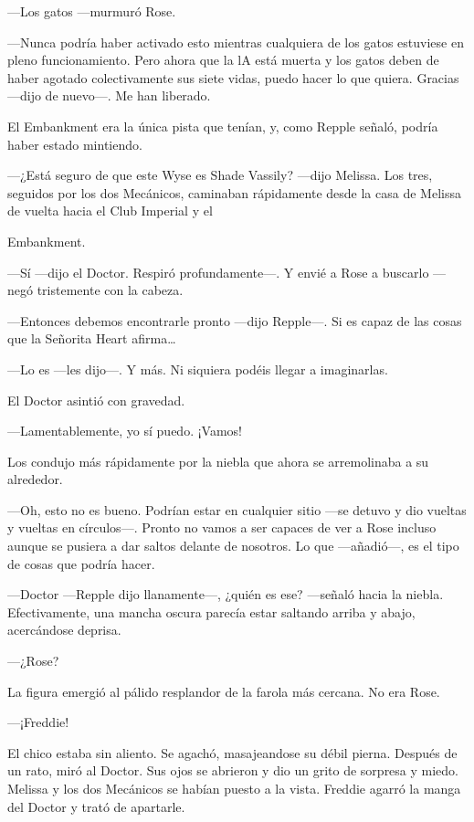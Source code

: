 {---Los gatos ---murmuró Rose.}

{---Nunca podría haber activado esto mientras cualquiera de los gatos
	estuviese en pleno funcionamiento. Pero ahora que la lA está muerta y
	los gatos deben de haber agotado colectivamente sus siete vidas, puedo
hacer lo que quiera. Gracias ---dijo de nuevo---. Me han liberado.}

\mbox{}

{El Embankment era la única pista que tenían, y, como Repple señaló,
podría haber estado mintiendo.}

{---¿Está seguro de que este Wyse es Shade Vassily? ---dijo Melissa. Los
	tres, seguidos por los dos Mecánicos, caminaban rápidamente desde la
casa de Melissa de vuelta hacia el Club Imperial y el}

{Embankment.}

{---Sí ---dijo el Doctor. Respiró profundamente---. Y envié a Rose a
buscarlo ---negó tristemente con la cabeza.}

{---Entonces debemos encontrarle pronto ---dijo Repple---. Si es capaz
	de las cosas que la Señorita Heart afirma\ldots{}}

{---Lo es ---les dijo---. Y más. Ni siquiera podéis llegar a
imaginarlas.}

{El Doctor asintió con gravedad.}

{---Lamentablemente, yo sí puedo. ¡Vamos!}

{Los condujo más rápidamente por la niebla que ahora se arremolinaba a
su alrededor.}

{---Oh, esto no es bueno. Podrían estar en cualquier sitio ---se detuvo
	y dio vueltas y vueltas en círculos---. Pronto no vamos a ser capaces de
	ver a Rose incluso aunque se pusiera a dar saltos delante de nosotros.
Lo que ---añadió---, es el tipo de cosas que podría hacer.}

{---Doctor ---Repple dijo llanamente---, ¿quién es ese? ---señaló hacia
	la niebla. Efectivamente, una mancha oscura parecía estar saltando
arriba y abajo, acercándose deprisa.}

{---¿Rose?}

{La figura emergió al pálido resplandor de la farola más cercana. No era
Rose.}

{---¡Freddie!}

{El chico estaba sin aliento. Se agachó, masajeandose su débil pierna.
	Después de un rato, miró al Doctor. Sus ojos se abrieron y dio un grito
	de sorpresa y miedo. Melissa y los dos Mecánicos se habían puesto a la
vista. Freddie agarró la manga del Doctor y trató de apartarle.}

